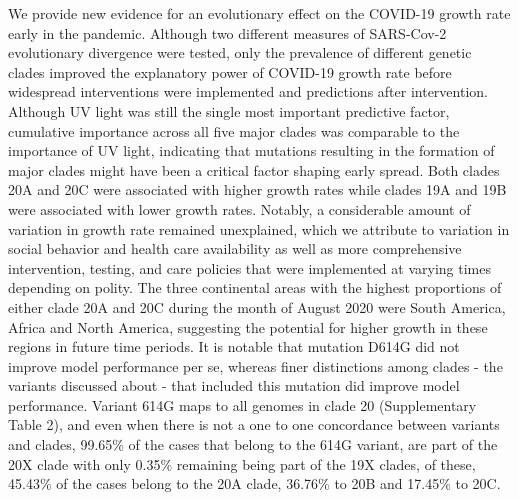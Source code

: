 \documentclass[9pt,twocolumn,twoside,lineno]{pnas-new}
\begin{document}
We provide new evidence for an evolutionary effect on the COVID-19 growth rate early in the pandemic. Although two different measures of SARS-Cov-2 evolutionary divergence were tested, only the prevalence of different genetic clades improved the explanatory power of COVID-19 growth rate before widespread interventions were implemented and predictions after intervention. Although UV light was still the single most important predictive factor, cumulative importance across all five major clades was comparable to the importance of UV light, indicating that mutations resulting in the formation of major clades might have been a critical factor shaping early spread. Both clades 20A and 20C were associated with higher growth rates while clades 19A and 19B were associated with lower growth rates. Notably, a considerable amount of variation in growth rate remained unexplained, which we attribute to variation in social behavior and health care availability as well as more comprehensive intervention, testing, and care policies that were implemented at varying times depending on polity. The three continental areas with the highest proportions of either clade 20A and 20C during the month of August 2020 were South America, Africa and North America, suggesting the potential for higher growth in these regions in future time periods. 
It is notable that mutation D614G did not improve model performance per se, whereas finer distinctions among clades - the variants discussed about - that included this mutation did improve model performance. Variant 614G maps to all genomes in clade 20 (Supplementary Table 2), and even when there is not a one to one concordance between variants and clades, 99.65\% of the cases that belong to the 614G variant, are part of the 20X clade with only 0.35\% remaining being part of  the 19X clades, of these, 45.43\% of the cases belong to the 20A clade, 36.76\% to 20B and 17.45\% to 20C.
\end{document}
